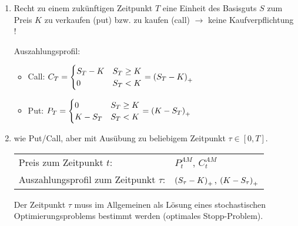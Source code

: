 \begin{enumerate}[leftmargin=*, label=(\alph*)]
	
	\item {}
	
	Recht zu einem zukünftigen Zeitpunkt $T$ eine Einheit des Basisguts $S$ zum Preis $K$ zu verkaufen (put) bzw. zu kaufen (call)
	$\to$ keine Kaufverpflichtung !
	
	Auszahlungsprofil:
	\begin{itemize}
		\item Call: $C_T = \begin{cases} S_T - K & S_T \ge K \\ 0 & S_T < K \end{cases} = \left( S_T - K \right)_+$
		\item Put: $P_T = \begin{cases} 0 & S_T \ge K \\ K - S_T & S_T < K \end{cases} = \left( K - S_T \right)_+$ 
	\end{itemize}

	\item {}
	
	wie Put/Call, aber mit Ausübung zu beliebigem Zeitpunkt $\tau \in [0,T]$.
	
	\begin{tabular}{ll}
		Preis zum Zeitpunkt $t$: & $P_t^{AM}$, $C_t^{AM}$ \\
		Auszahlungsprofil zum Zeitpunkt $\tau$: & $\left( S_\tau - K \right)_+$, $\left( K - S_\tau \right)_+$
	\end{tabular}
	
	Der Zeitpunkt $\tau$ muss im Allgemeinen als Lösung eines stochastischen Optimierungsproblems bestimmt werden (optimales Stopp-Problem).
\end{enumerate}